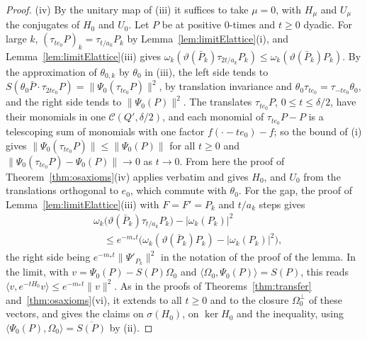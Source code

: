 \documentclass[aps,prd,twocolumn,superscriptaddress,nofootinbib,longbibliography,floatfix,amsmath,amssymb,10pt]{revtex4-2}
\theoremstyle{definition}
\theoremstyle{remark}
\newcommand{\ip}[2]{\langle #1,#2\rangle}
\begin{document}
\begin{proof}
(iv) By the unitary map of (iii) it suffices to take $\mu=0$, with $H_\mu$
and $U_\mu$ the conjugates of $H_0$ and $U_0$. Let $P$ be at positive
$0$-times and $t\ge0$ dyadic. For large $k$, $(\tau_{te_0}P)_k=\tau_{t/a_k}
P_k$ by Lemma~\ref{lem:limitElattice}(i), and Lemma~\ref{lem:limitElattice}(iii)
gives $\omega_k(\vartheta(\bar P_k)\tau_{2t/a_k}P_k)\le\omega_k(\vartheta(
\bar P_k)P_k)$. By the approximation of $\theta_{0,k}$ by $\theta_0$ in
(iii), the left side tends to $S(\theta_0\bar P\cdot\tau_{2te_0}P)=\|\Psi_0(
\tau_{te_0}P)\|^2$, by translation invariance and $\theta_0\tau_{te_0}=
\tau_{-te_0}\theta_0$, and the right side tends to $\|\Psi_0(P)\|^2$. The
translates $\tau_{te_0}P$, $0\le t\le\delta/2$, have their monomials in one
$\mathcal C(Q',\delta/2)$, and each monomial of $\tau_{te_0}P-P$ is a
telescoping sum of monomials with one factor $f(\cdot-te_0)-f$; so the
bound of (i) gives $\|\Psi_0(\tau_{te_0}P)\|\le\|\Psi_0(P)\|$ for all
$t\ge0$ and $\|\Psi_0(\tau_{te_0}P)-\Psi_0(P)\|\to0$ as $t\to0$. From here
the proof of Theorem~\ref{thm:osaxioms}(iv) applies verbatim and gives
$H_0$, and $U_0$ from the translations orthogonal to $e_0$, which commute
with $\theta_0$. For the gap, the proof of
Lemma~\ref{lem:limitElattice}(iii) with $F=F'=P_k$ and $t/a_k$ steps gives
\[
\begin{split}
&\omega_k\bigl(\vartheta(\bar P_k)\tau_{t/a_k}P_k\bigr)-|\omega_k(P_k)|^2\\
&\quad\le e^{-m_*t}\bigl(\omega_k(\vartheta(\bar P_k)P_k)-|\omega_k(P_k)|^2
\bigr),
\end{split}
\]
the right side being $e^{-m_*t}\|\Psi'_{P_k}\|^2$ in the notation of the
proof of the lemma. In the limit, with $v=\Psi_0(P)-S(P)\Omega_0$ and
$\ip{\Omega_0}{\Psi_0(P)}=S(P)$, this reads $\ip v{e^{-tH_0}v}\le
e^{-m_*t}\|v\|^2$. As in the proofs of Theorems~\ref{thm:transfer}
and~\ref{thm:osaxioms}(vi), it extends to all $t\ge0$ and to the closure
$\Omega_0^\perp$ of these vectors, and gives the claims on $\sigma(H_0)$, on
$\ker H_0$ and the inequality, using $\ip{\Psi_0(P)}{\Omega_0}=
\overline{S(P)}$ by (ii).


\end{proof}
\end{document}
